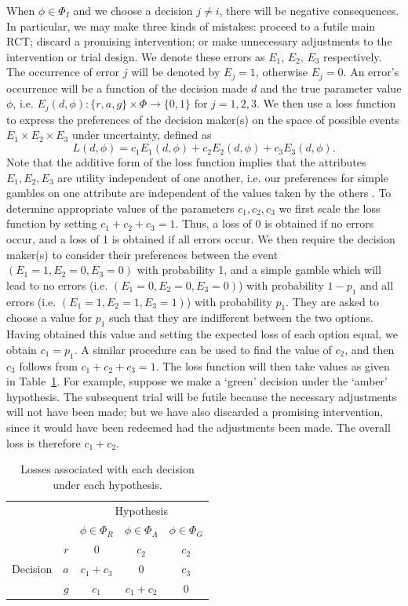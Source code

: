 \documentclass[AMA,STIX1COL]{WileyNJD-v2}
\begin{document}
When $\phi \in \Phi_{I}$ and we choose a decision $j \neq i$, there will be negative consequences. In particular, we may make three kinds of mistakes: proceed to a futile main RCT; discard a promising intervention; or make unnecessary adjustments to the intervention or trial design. We denote these errors as $E_1$, $E_2$, $E_3$ respectively. The occurrence of error $j$ will be denoted by $E_j = 1$, otherwise $E_j = 0$. An error's occurrence will be a function of the decision made $d$ and the true parameter value $\phi$, i.e. $E_j(d, \phi): \{r, a, g\} \times \Phi \rightarrow \{0,1\}$ for $j = 1,2,3$. We then use a loss function to express the preferences of the decision maker(s) on the space of possible events $E_1 \times E_2 \times E_3$ under uncertainty, defined as
$$
L(d, \phi) = c_1 E_1(d, \phi) + c_2 E_2(d, \phi) + c_3 E_3(d, \phi).
$$
Note that the additive form of the loss function implies that the attributes $E_1, E_2, E_3$ are utility independent of one another, i.e. our preferences for simple gambles on one attribute are independent of the values taken by the others \cite{French2000}. To determine appropriate values of the parameters $c_1, c_2, c_3$ we first scale the loss function by setting $c_1 + c_2 + c_3 = 1$. Thus, a loss of 0 is obtained if no errors occur, and a loss of 1 is obtained if all errors occur. We then require the decision maker(s) to consider their preferences between the event $(E_1 = 1, E_2 = 0, E_3 = 0)$ with probability 1, and a simple gamble which will lead to no errors (i.e. $(E_1 = 0, E_2 = 0, E_3 = 0)$) with probability $1 - p_1$ and all errors (i.e. $(E_1 = 1, E_2 = 1, E_3 = 1)$) with probability $p_1$. They are asked to choose a value for $p_1$ such that they are indifferent between the two options. Having obtained this value and setting the expected loss of each option equal, we obtain $c_1 = p_1$. A similar procedure can be used to find the value of $c_2$, and then $c_3$ follows from $c_1 + c_2 + c_3 = 1$. The loss function will then take values as given in Table~\ref{tab:loss}. For example, suppose we make a `green' decision under the `amber' hypothesis. The subsequent trial will be futile because the necessary adjustments will not have been made; but we have also discarded a promising intervention, since it would have been redeemed had the adjustments been made. The overall loss is therefore $c_{1} + c_{2}$.

\begin{table}
\caption{Losses associated with each decision under each hypothesis.}
\centering
\begin{tabular}{r r c c c}
\toprule
& & \multicolumn{3}{c}{Hypothesis} \\
& & $\phi \in \Phi_{R}$ & $\phi \in \Phi_{A}$ & $\phi \in \Phi_{G}$ \\
\midrule
\multirow{3}{*}{Decision} & $r$ & 0 & $c_{2}$ & $c_{2}$ \\
 & $a$ & $c_{1} + c_{3}$ & 0 & $c_{3}$ \\
 & $g$ & $c_{1}$ & $c_{1} + c_{2}$ & 0  \\
\bottomrule
\end{tabular}
\label{tab:loss}
\end{table}
\end{document}
